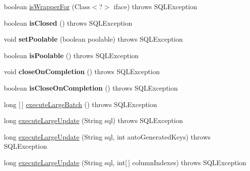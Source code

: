 \begin{DoxyCompactItemize}
\item 
boolean \mbox{\hyperlink{classcom_1_1mysql_1_1cj_1_1jdbc_1_1_statement_wrapper_ac909b23a76074610336931e26f634d2d}{is\+Wrapper\+For}} (Class$<$?$>$ iface)  throws S\+Q\+L\+Exception 
\item 
\mbox{\label{classcom_1_1mysql_1_1cj_1_1jdbc_1_1_statement_wrapper_a8accb59a362a26143c028245bea8c7ff}} 
boolean {\bfseries is\+Closed} ()  throws S\+Q\+L\+Exception 
\item 
\mbox{\label{classcom_1_1mysql_1_1cj_1_1jdbc_1_1_statement_wrapper_a5b9788a62e25c619e0af80c81ab4d570}} 
void {\bfseries set\+Poolable} (boolean poolable)  throws S\+Q\+L\+Exception 
\item 
\mbox{\label{classcom_1_1mysql_1_1cj_1_1jdbc_1_1_statement_wrapper_a653108d32ffc4a2809198e379ede7c9a}} 
boolean {\bfseries is\+Poolable} ()  throws S\+Q\+L\+Exception 
\item 
\mbox{\label{classcom_1_1mysql_1_1cj_1_1jdbc_1_1_statement_wrapper_a02e89b78190945fc4ce29b8a2dbf4c9f}} 
void {\bfseries close\+On\+Completion} ()  throws S\+Q\+L\+Exception 
\item 
\mbox{\label{classcom_1_1mysql_1_1cj_1_1jdbc_1_1_statement_wrapper_a67038f116aab09401c6001bcded6fded}} 
boolean {\bfseries is\+Close\+On\+Completion} ()  throws S\+Q\+L\+Exception 
\item 
long \mbox{[}$\,$\mbox{]} \mbox{\hyperlink{classcom_1_1mysql_1_1cj_1_1jdbc_1_1_statement_wrapper_a1d380811bb181cb0d92ca408d29aa3a0}{execute\+Large\+Batch}} ()  throws S\+Q\+L\+Exception 
\item 
long \mbox{\hyperlink{classcom_1_1mysql_1_1cj_1_1jdbc_1_1_statement_wrapper_abb4c8e14cb82eeb39515f31705912030}{execute\+Large\+Update}} (String sql)  throws S\+Q\+L\+Exception 
\item 
long \mbox{\hyperlink{classcom_1_1mysql_1_1cj_1_1jdbc_1_1_statement_wrapper_a65bd051d4128bab4bcbaa58793a64350}{execute\+Large\+Update}} (String sql, int auto\+Generated\+Keys)  throws S\+Q\+L\+Exception 
\item 
long \mbox{\hyperlink{classcom_1_1mysql_1_1cj_1_1jdbc_1_1_statement_wrapper_a30669664b8085abf39605e17a93a2267}{execute\+Large\+Update}} (String sql, int\mbox{[}$\,$\mbox{]} column\+Indexes)  throws S\+Q\+L\+Exception 

\end{DoxyCompactItemize}
